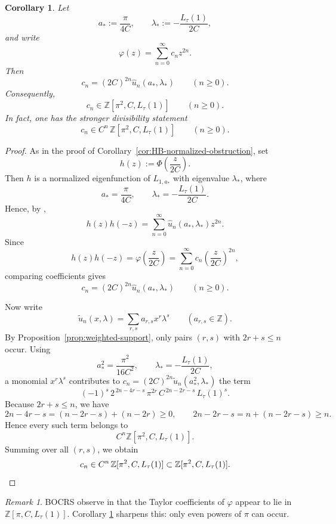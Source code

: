 \documentclass[11pt,letterpaper]{amsart}
\numberwithin{equation}{section}
\theoremstyle{plain}
\newtheorem{corollary}[theorem]{Corollary}
\theoremstyle{remark}
\newtheorem{remark}[theorem]{Remark}
\newcommand{\Z}{\mathbb{Z}}
\begin{document}
\begin{corollary}\label{cor:HB-coefficient-ring}
Let
\[
a_*:=\frac{\pi}{4C},
\qquad
\lambda_*:=-\frac{L_\tau(1)}{2C},
\]
and write
\[
\varphi(z)=\sum_{n=0}^{\infty} c_n z^{2n}.
\]
Then
\begin{equation}\label{eq:cn-uhat}
c_n=(2C)^{2n}\widehat u_n(a_*,\lambda_*)
\qquad(n\ge 0).
\end{equation}
Consequently,
\[
c_n\in \Z[\pi^2,C,L_\tau(1)]
\qquad(n\ge 0).
\]
In fact, one has the stronger divisibility statement
\[
c_n\in C^n\,\Z[\pi^2,C,L_\tau(1)]
\qquad(n\ge 0).
\]
\end{corollary}

\begin{proof}
As in the proof of Corollary~\ref{cor:HB-normalized-obstruction}, set
\[
h(z):=\Phi\!\left(\frac{z}{2C}\right).
\]
Then \(h\) is a normalized eigenfunction of \(L_{1,a_*}\) with eigenvalue \(\lambda_*\), where
\[
a_*=\frac{\pi}{4C},
\qquad
\lambda_*=-\frac{L_\tau(1)}{2C}.
\]
Hence, by \cite[\S10.3]{BOCRS},
\[
h(z)h(-z)=\sum_{n=0}^{\infty}\widehat u_n(a_*,\lambda_*)z^{2n}.
\]
Since
\[
h(z)h(-z)=\varphi\!\left(\frac{z}{2C}\right)
=
\sum_{n=0}^{\infty}c_n\left(\frac{z}{2C}\right)^{2n},
\]
comparing coefficients gives
\[
c_n=(2C)^{2n}\widehat u_n(a_*,\lambda_*)
\qquad(n\ge0).
\]

Now write
\[
\widetilde u_n(x,\lambda)=\sum_{r,s} a_{r,s}x^r\lambda^s
\qquad(a_{r,s}\in \Z).
\]
By Proposition~\ref{prop:weighted-support}, only pairs \((r,s)\) with \(2r+s\le n\) occur.
Using
\[
a_*^2=\frac{\pi^2}{16C^2},
\qquad
\lambda_*=-\frac{L_\tau(1)}{2C},
\]
a monomial \(x^r\lambda^s\) contributes to
\(c_n=(2C)^{2n}\widetilde u_n(a_*^2,\lambda_*)\)
the term
\[
(-1)^s\,2^{\,2n-4r-s}\,
\pi^{2r}\,
C^{\,2n-2r-s}\,
L_\tau(1)^s.
\]
Because \(2r+s\le n\), we have
\[
2n-4r-s=(n-2r-s)+(n-2r)\ge0,
\qquad
2n-2r-s=n+(n-2r-s)\ge n.
\]
Hence every such term belongs to
\[
C^n\Z[\pi^2,C,L_\tau(1)].
\]
Summing over all \((r,s)\), we obtain
\[
c_n\in C^n\,\Z[\pi^2,C,L_\tau(1)]
\subset \Z[\pi^2,C,L_\tau(1)].
\qedhere
\]
\end{proof}

\begin{remark}\label{rem:HB-pi2-sharpening}
BOCRS observe in \cite[\S10.3]{BOCRS} that the Taylor coefficients of \(\varphi\) appear to
lie in \(\Z[\pi,C,L_\tau(1)]\). Corollary \ref{cor:HB-coefficient-ring} sharpens this:
only even powers of \(\pi\) can occur.
\end{remark}
\end{document}
